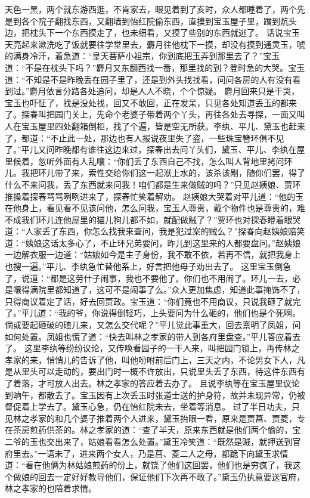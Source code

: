 \documentclass[12pt,oneside]{book}
\begin{document}
天色一黑，两个就东游西逛，不肯家去，眼见着到了亥时，众人都睡着了，两个先是到各个院子翻找东西，又翻墙到怡红院偷东西，直摸到宝玉屋子里，蹭到炕头边，把枕头下一个东西摸走了，也未细看，又摸了些别的东西就逃了。
话说宝玉天亮起来漱洗吃了饭就要往学堂里去，麝月往他枕下一摸，却没有摸到通灵玉，唬的满身冷汗，着急道：“皇天菩萨小祖宗，你到底把玉弄到那里去了？”宝玉道：“不是在枕头下吗？”麝月又东翻西找一番，那里找的到？登时急的大哭。宝玉道：“不知是不是昨晚丢在园子里了，还是到外头找找看，问问各房的人有没有看到过。”麝月依言分路各处追问，却是人人不晓，个个惊疑。
麝月回来只是干哭，宝玉也吓怔了，找是没处找，回又不敢回，正在发呆，只见各处知道丢玉的都来了。探春叫把园门关上，先命个老婆子带着两个丫头，再往各处去寻探，一面又叫人在宝玉屋里四处翻箱倒柜，找了个遍，皆是空无所获。李纨、平儿、黛玉也赶来了，都道：“不止此一处，那边也有人报说夜里失了盗，一些珠宝簪环俱不见了。”平儿又问昨晚都有谁往这边来过，探春出去问丫头们，黛玉、平儿、李纨在屋里候着，忽听外面有人乱嚷：“你们丢了东西自己不找，怎么叫人背地里拷问环儿。我把环儿带了来，索性交给你们这一起洑上水的，该杀该剐，随你们罢，得了什么不来问我，丢了东西就来问我！咱们都是生来做贼的吗？”只见赵姨娘、贾环推搡着探春骂骂咧咧进来了，探春忙笑着解劝。
赵姨娘大哭着对平儿道：“他的玉在他身上，看见看不见该问他，怎么问我，宝玉人尊贵，戴个物件也是尊贵的，难不成我们环儿连他屋里的猫儿狗儿都不如，就配做贼了？”贾环也对探春瞪着眼哭道：“人家丢了东西，你怎么找我来查问，我是犯过案的贼么？”探春向赵姨娘赔笑道：“姨娘这话太多心了，不止环兄弟要问，昨儿到这里来的人都要盘问。”赵姨娘一边解衣服一边道：“姑娘如今是主子身份，我不敢不依，若再不信，就把我身上也搜一遍。”平儿、李纨急忙替他系上，好言把他母子劝出去了。
这里宝玉倒急了，说道：“都是这劳什子闹事，我也不要他了。你们也不用闹了。环儿一去，必是嚷得满院里都知道了，这可不是闹事了么。”众人更加焦虑，知道此事掩饰不了，只得商议着定了话，好去回贾政。宝玉道：“你们竟也不用商议，只说我砸了就完了。”平儿道：“我的爷，你说得倒轻巧，上头要问为什么砸的，他们也是个死啊。倘或要起砸破的碴儿来，又怎么交代呢？”平儿觉此事重大，回去禀明了凤姐，问如何处置。凤姐也慌了道：“快去叫林之孝家的带人到各府里盘查。”平儿答应着去了。
这里李纨等纷纷议论，又传唤看园子的一干人来，叫把园门锁上，再传林之孝家的来，悄悄儿的告诉了他，叫他吩咐前后门上，三天之内，不论男女下人，凡是从里头可以走动的，要出门时一概不许放出，只说里头丢了东西，待这件东西有了着落，才可放人出去。林之孝家的答应着去办了。
且说李纨等在宝玉屋里议论到晌午，都散去了。宝玉因有上次丢玉时张道士送的护身符，故并未现异常，仍被督促着上学去了。黛玉心急，仍在怡红院未去，坐着等消息。
过了半日功夫，只见林之孝家的和几个婆子推着两个人进来，黛玉抬眼一看，原来是贾菖、贾菱，专在茶房煎药供茶的。林之孝家的道：“查了半天，原来东西就是他们两个偷的，宝二爷的玉也交出来了，姑娘看看怎么处置。”黛玉冷笑道：“既然是贼，就押送到官府里去。”一语未了，进来两个女人，乃是菖、菱二人之母，都跪下向黛玉求情道：“看在他俩为林姑娘煎药的份上，就饶了他们这回罢，他们也是穷疯了，我这个做娘的回去一定好好教导他们，保证他们下次再不敢了。”黛玉仍执意要送官府，林之孝家的也陪着求情。
\end{document}
